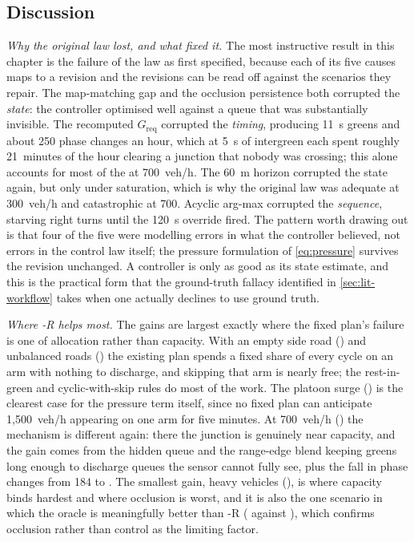 \subsection{Discussion}\label{sec:eval-discussion}

\textit{Why the original law lost, and what fixed it.} The most instructive result in this chapter is the
failure of the law as first specified, because each of its five causes maps to a revision and the revisions
can be read off against the scenarios they repair. The map-matching gap and the occlusion persistence both
corrupted the \emph{state}: the controller optimised well against a queue that was substantially invisible.
The recomputed $G_{\text{req}}$ corrupted the \emph{timing}, producing 11~s greens and about 250 phase
changes an hour, which at 5~s of intergreen each spent roughly 21~minutes of the hour clearing a junction
that nobody was crossing; this alone accounts for most of the  at 700~veh/h. The 60~m horizon
corrupted the state again, but only under saturation, which is why the original law was adequate at
300~veh/h and catastrophic at 700. Acyclic arg-max corrupted the \emph{sequence}, starving right turns until
the 120~s override fired. The pattern worth drawing out is that four of the five were modelling errors in
what the controller believed, not errors in the control law itself; the pressure formulation of
\cref{eq:pressure} survives the revision unchanged. A controller is only as good as its state estimate, and
this is the practical form that the ground-truth fallacy identified in \cref{sec:lit-workflow} takes when one
actually declines to use ground truth.

\textit{Where \prism{}-R helps most.} The gains are largest exactly where the fixed plan's failure is one of
allocation rather than capacity. With an empty side road () and unbalanced roads
() the existing plan spends a fixed share of every cycle on an arm with nothing to discharge,
and skipping that arm is nearly free; the rest-in-green and cyclic-with-skip rules do most of the work.
The platoon surge () is the clearest case for the pressure term itself, since no fixed plan can
anticipate 1,500~veh/h appearing on one arm for five minutes. At 700~veh/h () the mechanism is
different again: there the junction is genuinely near capacity, and the gain comes from the hidden queue and
the range-edge blend keeping greens long enough to discharge queues the sensor cannot fully see, plus the
fall in phase changes from 184 to . The smallest gain, heavy vehicles (), is where
capacity binds hardest and where occlusion is worst, and it is also the one scenario in which the oracle is
meaningfully better than \prism{}-R ( against ), which confirms occlusion rather than
control as the limiting factor.

